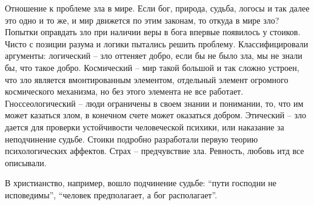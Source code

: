 \documentclass[a4paper, 12pt]{article}
\begin{document}
Отношение к проблеме зла в мире. Если бог, природа, судьба, логосы и так далее это одно и то же, и мир движется по этим законам, то откуда в мире зло? Попытки оправдать зло при наличии веры в бога впервые появилось у стоиков. Чисто с позиции разума и логики пытались решить проблему. Классифицировали аргументы: логический -- зло оттеняет добро, если бы не было зла, мы не знали бы, что такое добро. Космический -- мир такой большой и так сложно устроен, что зло является вмонтированным элементом, отдельный элемент огромного космического механизма, но без этого элемента не все работает. Гноссеологический -- люди ограничены в своем знании и понимании, то, что им может казаться злом, в конечном счете может оказаться добром. Этический -- зло дается для проверки устойчивости человеческой психики, или наказание за неподчинение судьбе. Стоики подробно разработали первую теорию психологических аффектов. Страх -- предчувствие зла. Ревность, любовь итд все описывали. 

В христианство, например, вошло подчинение судьбе: ``пути господни не исповедимы'', ``человек предполагает, а бог располагает''. 
\end{document}
